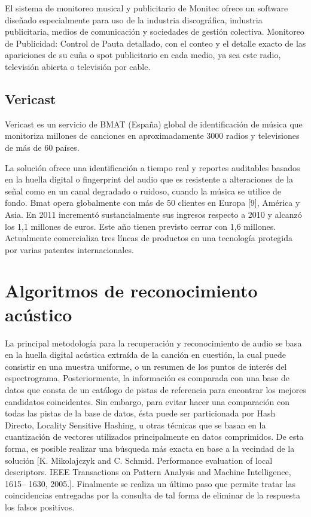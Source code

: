 El sistema de monitoreo musical y publicitario de Monitec ofrece un software diseñado especialmente para uso de la industria discográfica, industria publicitaria, medios de comunicación y sociedades de gestión colectiva. Monitoreo de Publicidad: Control de Pauta detallado, con el conteo y el detalle exacto de las apariciones de su cuña o spot publicitario en cada medio, ya sea este radio, televisión abierta o televisión por cable.


\subsection{Vericast}
Vericast es un servicio de BMAT (España) global de identificación de música que monitoriza millones de canciones en aproximadamente 3000 radios y televisiones de más de 60 países.

\bigskip

La solución ofrece una identificación a tiempo real y reportes auditables basados en la huella digital o fingerprint del audio que es resistente a alteraciones de la señal como en un canal degradado o ruidoso, cuando la música se utilice de fondo.
Bmat opera globalmente con más de 50 clientes en Europa [9], América y Asia. En 2011 incrementó sustancialmente sus ingresos respecto a 2010 y alcanzó los 1,1 millones de euros. Este año tienen previsto cerrar con 1,6 millones. Actualmente comercializa tres líneas de productos en una tecnología protegida por varias patentes internacionales.


\section{Algoritmos de reconocimiento acústico} \label{sec:AlgoritmosRA}

La principal metodología para la recuperación y reconocimiento de audio se basa en la huella digital acústica extraída de la canción en cuestión, la cual puede consistir en una muestra uniforme, o un resumen de los puntos de interés del espectrograma. 
Posteriormente, la información es comparada con una base de datos que consta de un catálogo de pistas de referencia para encontrar los mejores candidatos coincidentes. 
Sin embargo, para evitar hacer una comparación con todas las pistas de la base de datos, ésta puede ser particionada por Hash Directo, Locality Sensitive Hashing, u otras técnicas que se basan en la cuantización de vectores utilizados principalmente en datos comprimidos. De esta forma, es posible realizar una búsqueda más exacta en base a la vecindad de la solución [K. Mikolajczyk and C. Schmid. Performance evaluation of local descriptors. IEEE Transactions on Pattern Analysis and Machine Intelligence, 1615– 1630, 2005.].
Finalmente se realiza un último paso que permite tratar las coincidencias entregadas por la consulta de tal forma de eliminar de la respuesta los falsos positivos. 


